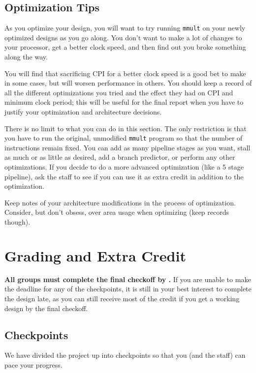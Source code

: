 \documentclass[11pt]{article}
\begin{document}
\subsection{Optimization Tips}
As you optimize your design, you will want to try running \verb|mmult| on your newly optimized designs as you go along. You don't want to make a lot of changes to your processor, get a better clock speed, and then find out you broke something along the way.

You will find that sacrificing CPI for a better clock speed is a good bet to make in some cases, but will worsen performance in others.
You should keep a record of all the different optimizations you tried and the effect they had on CPI and minimum clock period; this will be useful for the final report when you have to justify your optimization and architecture decisions.

There is no limit to what you can do in this section.
The only restriction is that you have to run the original, unmodified \verb|mmult| program so that the number of instructions remain fixed.
You can add as many pipeline stages as you want, stall as much or as little as desired, add a branch predictor, or perform any other optimizations.
If you decide to do a more advanced optimization (like a 5 stage pipeline), ask the staff to see if you can use it as extra credit in addition to the optimization.

Keep notes of your architecture modifications in the process of optimization.
Consider, but don't obsess, over area usage when optimizing (keep records though).

\pagebreak

\section{Grading and Extra Credit}
\textbf{All groups must complete the final checkoff by \finalCheckoffDueDate.}
If you are unable to make the deadline for any of the checkpoints, it is still in your best interest to complete the design late, as you can still receive most of the credit if you get a working design by the final checkoff.

\subsection{Checkpoints}
\label{checkoff}
We have divided the project up into checkpoints so that you (and the staff) can pace your progress.
\end{document}
